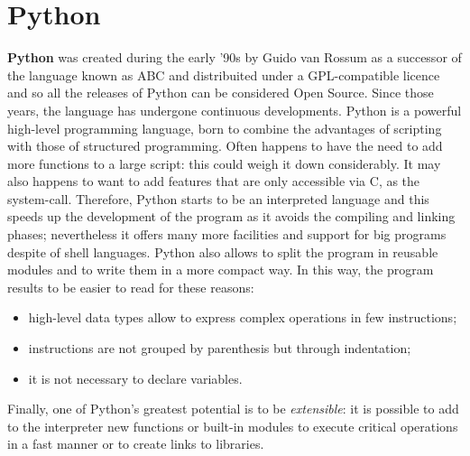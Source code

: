 \documentclass[a4paper,12pt,,titlepage,openright]{report}
\begin{document}
\section{Python}
\textbf{Python} was created during the early '90s by Guido van Rossum as a successor of the language known as ABC and distribuited under a GPL-compatible licence and so all the releases of Python can be considered Open Source. Since those years, the language has undergone continuous developments.
Python is a powerful high-level programming language, born to combine the advantages of scripting with those of structured programming. Often happens to have the need to add more functions to a large script: this could weigh it down considerably. It may also happens to want to add features that are only accessible via C, as the system-call.
Therefore, Python starts to be an interpreted language and this speeds up the development of the program as it avoids the compiling and linking phases; nevertheless it offers many more facilities and support for big programs despite of shell languages. Python also allows to split the program in reusable modules and to write them in a more compact way. In this way, the program results to be easier to read for these reasons:
\begin{itemize}
\item high-level data types allow to express complex operations in few instructions;
\item instructions are not grouped by parenthesis but through indentation;
\item it is not necessary to declare variables.
\end{itemize}
Finally, one of Python's greatest potential is to be \textit{extensible}: it is possible to add to the interpreter new functions or built-in modules to execute critical operations in a fast manner or to create links to libraries.
\end{document}
